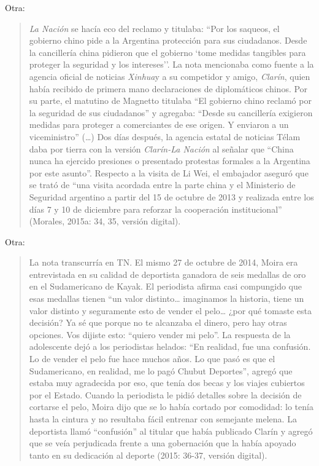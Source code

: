 {Otra:

\begin{quote}
\emph{La Nación} se hacía eco del reclamo y titulaba: ``Por los saqueos, el gobierno chino pide a la Argentina protección para sus ciudadanos. Desde la cancillería china pidieron que el gobierno `tome medidas tangibles para proteger la seguridad y los intereses''. La nota mencionaba como fuente a la agencia oficial de noticias \emph{Xinhua}y a su competidor y amigo, \emph{Clarín}, quien había recibido de primera mano declaraciones de diplomáticos chinos. Por su parte, el matutino de Magnetto titulaba ``El gobierno chino reclamó por la seguridad de sus ciudadanos'' y agregaba: ``Desde su cancillería exigieron medidas para proteger a comerciantes de ese origen. Y enviaron a un viceministro'' (\ldots) Dos días después, la agencia estatal de noticias Télam daba por tierra con la versión \emph{Clarín-La Nación} al señalar que ``China nunca ha ejercido presiones o presentado protestas formales a la Argentina por este asunto''. Respecto a la visita de Li Wei, el embajador aseguró que se trató de ``una visita acordada entre la parte china y el Ministerio de Seguridad argentino a partir del 15 de octubre de 2013 y realizada entre los días 7 y 10 de diciembre para reforzar la cooperación institucional'' (Morales, 2015a: 34, 35, versión digital).
\end{quote}

Otra:

\begin{quote}
La nota transcurría en TN. El mismo 27 de octubre de 2014, Moira era entrevistada en su calidad de deportista ganadora de seis medallas de oro en el Sudamericano de Kayak. El periodista afirma casi compungido que esas medallas tienen ``un valor distinto\ldots{} imaginamos la historia, tiene un valor distinto y seguramente esto de vender el pelo\ldots{} ¿por qué tomaste esta decisión? Ya sé que porque no te alcanzaba el dinero, pero hay otras opciones. Vos dijiste esto: ``quiero vender mi pelo''. La respuesta de la adolescente dejó a los periodistas helados: ``En realidad, fue una confusión. Lo de vender el pelo fue hace muchos años. Lo que pasó es que el Sudamericano, en realidad, me lo pagó Chubut Deportes'', agregó que estaba muy agradecida por eso, que tenía dos becas y los viajes cubiertos por el Estado. Cuando la periodista le pidió detalles sobre la decisión de cortarse el pelo, Moira dijo que se lo había cortado por comodidad: lo tenía hasta la cintura y no resultaba fácil entrenar con semejante melena. La deportista llamó ``confusión'' al titular que había publicado Clarín y agregó que se veía perjudicada frente a una gobernación que la había apoyado tanto en su dedicación al deporte (2015: 36-37, versión digital).
\end{quote}

}
